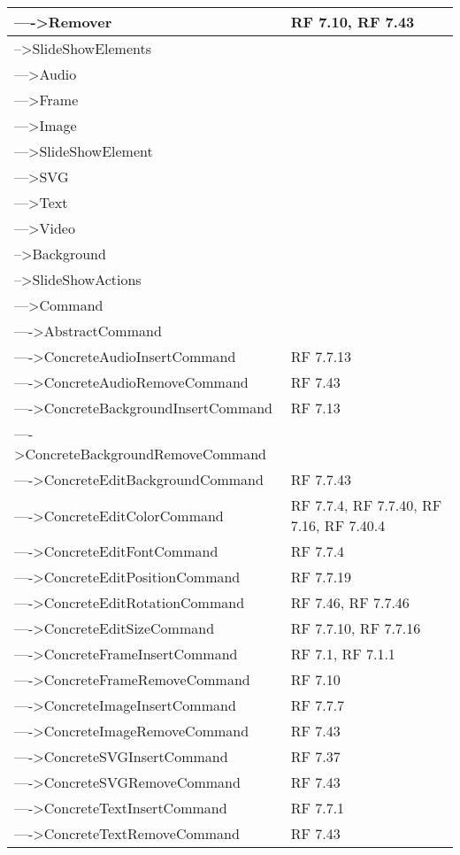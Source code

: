 {\begin{longtable} [c]{| p{8cm} | p{5cm} |}
 \hline 
---->Remover & RF 7.10, RF 7.43\\ 
 \hline 
-->SlideShowElements & \\ 
 \hline 
--->Audio & \\ 
 \hline 
--->Frame & \\ 
 \hline 
--->Image & \\ 
 \hline 
--->SlideShowElement & \\ 
 \hline 
--->SVG & \\ 
 \hline 
--->Text & \\ 
 \hline 
--->Video & \\ 
 \hline 
-->Background & \\ 
 \hline 
-->SlideShowActions & \\ 
 \hline 
--->Command & \\ 
 \hline 
---->AbstractCommand & \\ 
 \hline 
---->ConcreteAudioInsertCommand & RF 7.7.13\\ 
 \hline 
---->ConcreteAudioRemoveCommand & RF 7.43\\ 
 \hline 
---->ConcreteBackgroundInsertCommand & RF 7.13\\ 
 \hline 
---->ConcreteBackgroundRemoveCommand & \\ 
 \hline 
---->ConcreteEditBackgroundCommand & RF 7.7.43\\ 
 \hline 
---->ConcreteEditColorCommand & RF 7.7.4, RF 7.7.40, RF 7.16, RF 7.40.4\\ 
 \hline 
---->ConcreteEditFontCommand & RF 7.7.4\\ 
 \hline 
---->ConcreteEditPositionCommand & RF 7.7.19\\ 
 \hline 
---->ConcreteEditRotationCommand & RF 7.46, RF 7.7.46\\ 
 \hline 
---->ConcreteEditSizeCommand & RF 7.7.10, RF 7.7.16\\ 
 \hline 
---->ConcreteFrameInsertCommand & RF 7.1, RF 7.1.1\\ 
 \hline 
---->ConcreteFrameRemoveCommand & RF 7.10\\ 
 \hline 
---->ConcreteImageInsertCommand & RF 7.7.7\\ 
 \hline 
---->ConcreteImageRemoveCommand & RF 7.43\\ 
 \hline 
---->ConcreteSVGInsertCommand & RF 7.37\\ 
 \hline 
---->ConcreteSVGRemoveCommand & RF 7.43\\ 
 \hline 
---->ConcreteTextInsertCommand & RF 7.7.1\\ 
 \hline 
---->ConcreteTextRemoveCommand & RF 7.43\\ 

\end{longtable}}
